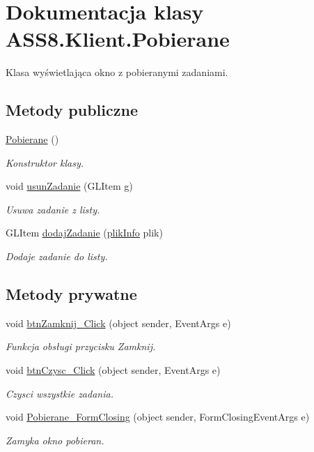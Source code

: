 \hypertarget{a00019}{
\section{Dokumentacja klasy ASS8.Klient.Pobierane}
\label{dd/da2/a00019}
}
Klasa wyświetlająca okno z pobieranymi zadaniami.  


\subsection*{Metody publiczne}
\begin{CompactItemize}
\item 
\hyperlink{a00019_60f6f87bc8f96efae8cb13c9b2da15bd}{Pobierane} ()
\begin{CompactList}\small\item\em Konstruktor klasy. \item\end{CompactList}\item 
void \hyperlink{a00019_06d8a33e39fdf38fa3955ce5c4a1abc4}{usunZadanie} (GLItem g)
\begin{CompactList}\small\item\em Usuwa zadanie z listy. \item\end{CompactList}\item 
GLItem \hyperlink{a00019_342268ebdae71abcd09819bba08f0f88}{dodajZadanie} (\hyperlink{a00018}{plikInfo} plik)
\begin{CompactList}\small\item\em Dodaje zadanie do listy. \item\end{CompactList}\end{CompactItemize}
\subsection*{Metody prywatne}
\begin{CompactItemize}
\item 
void \hyperlink{a00019_5c793ae5ccd31fe4509468eebfdc76b9}{btnZamknij\_\-Click} (object sender, EventArgs e)
\begin{CompactList}\small\item\em Funkcja obsługi przycisku Zamknij. \item\end{CompactList}\item 
void \hyperlink{a00019_ce1fb8ae1d066f42b327a30a1079765b}{btnCzysc\_\-Click} (object sender, EventArgs e)
\begin{CompactList}\small\item\em Czysci wszystkie zadania. \item\end{CompactList}\item 
void \hyperlink{a00019_03c2ed674c8d50df0614a7f175eed42d}{Pobierane\_\-FormClosing} (object sender, FormClosingEventArgs e)
\begin{CompactList}\small\item\em Zamyka okno pobieran. \item\end{CompactList}\end{CompactItemize}


